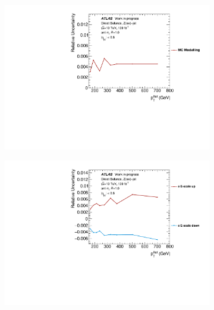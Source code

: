 \begin{figure}[t]
\centering
\begin{subfigure}[b]{0.48\textwidth}
    \centering
    \includegraphics[width=\textwidth]{plots/insitu/mctype_WIP.pdf}
    \caption{}
    \label{fig:insitupt:a}
\label{fig:insitupt:a}
\end{subfigure}
\begin{subfigure}[b]{0.48\textwidth}
    \centering
    \includegraphics[width=\textwidth]{plots/insitu/egamma_scale_WIP.pdf}
    \caption{}
    \label{fig:insitupt:b}
\end{subfigure}
\hfill
\begin{subfigure}[b]{0.48\textwidth}
    \centering

\end{subfigure}
\end{figure}
